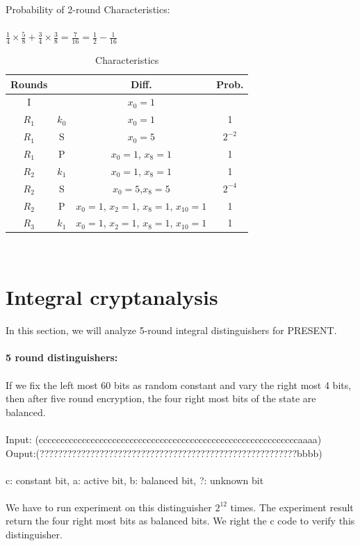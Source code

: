 \documentclass[journal=tosc,preprint]{iacrtrans}
\begin{document}
	Probability of 2-round Characteristics:\\\\
	$\frac{1}{4} \times \frac{5}{8}+\frac{3}{4} \times \frac{3}{8}=\frac{7}{16}=\frac{1}{2}-\frac{1}{16}$\\
\begin{table}[h!]
	\caption{Characteristics}
	\centering
	\begin{tabular}{ |c||c|c|c| }
		\hline
		Rounds & & Diff. & Prob. \\ \hline \hline
		I& & $x_0 = 1$ &  \\ 
		$R_1$& $k_0$ & $x_0 = 1$ & 1 \\
		$R_1$& S & $x_0 = 5$ & $2^{-2}$ \\
		$R_1$& P & $x_0 = 1$, $x_{8} = 1$ & 1 \\
		$R_2$& $k_1$ & $x_0 = 1$, $x_{8} = 1$ & 1 \\
		$R_2$& S & $x_0 = 5$,$x_8 = 5$ & $2^{-4}$ \\
		$R_2$& P & $x_0 = 1$, $x_2 = 1$, $x_8 = 1$, $x_{10} = 1$ & 1 \\
		$R_3$& $k_1$ & $x_0 = 1$, $x_2 = 1$, $x_8 = 1$, $x_{10} = 1$ & 1 \\
		 \hline
	\end{tabular}\\
\end{table}
\section{Integral cryptanalysis}
In this section, we will analyze 5-round integral distinguishers for PRESENT.\\\\
\textbf{5 round distinguishers:}\\\\
If we fix the left most 60 bits as random constant and vary the right most 4 bits, then after five round encryption, the four right most bits of the state are balanced.\\\\
Input: (ccccccccccccccccccccccccccccccccccccccccccccccccccccccccccccaaaa)\\
Ouput:(????????????????????????????????????????????????????????bbbb)\\\\
c: constant bit, a: active bit, b: balanced bit, ?: unknown bit\\\\
We have to run experiment on this distinguisher $2^{12}$ times. The experiment result return the four right most bits as balanced bits. We right the c code to verify this distinguisher.
\end{document}

